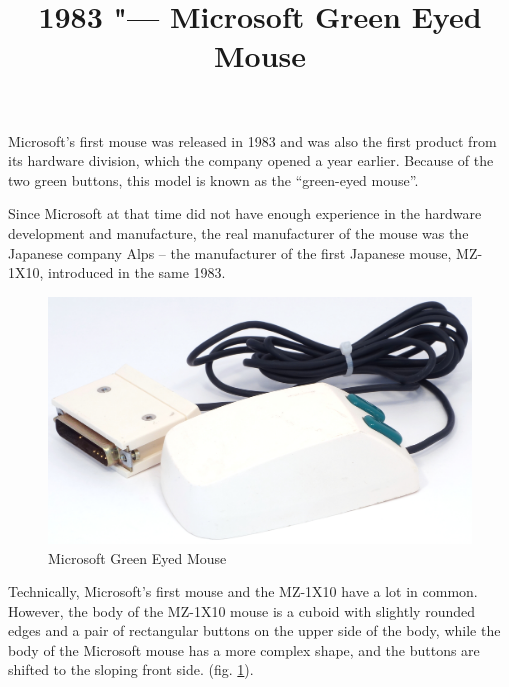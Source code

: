 \documentclass[11pt, a4paper]{article}
\begin{document}
\title{1983 "--- Microsoft Green Eyed Mouse}
\date{}
\maketitle
{}

Microsoft's first mouse was released in 1983 and was also the first product from its hardware division, which the company opened a year earlier. Because of the two green buttons, this model is known as the ``green-eyed mouse''.

Since Microsoft at that time did not have enough experience in the hardware development and manufacture, the real manufacturer of the mouse was the Japanese company Alps -- the manufacturer of the first Japanese mouse, MZ-1X10, introduced in the same 1983.

\begin{figure}[h]
   \centering
    \includegraphics[scale=0.6]{1983_microsoft_green_eyed_mouse/pic_30.jpg}
    \caption{Microsoft Green Eyed Mouse}
    \label{fig:MicrosoftGreenEyedPic}
\end{figure}

Technically, Microsoft's first mouse and the MZ-1X10 have a lot in common. However, the body of the MZ-1X10 mouse is a cuboid with slightly rounded edges and a pair of rectangular buttons on the upper side of the body, while the body of the Microsoft mouse has a more complex shape, and the buttons are shifted to the sloping front side. (fig.  \ref{fig:MicrosoftGreenEyedPic}).
\end{document}
